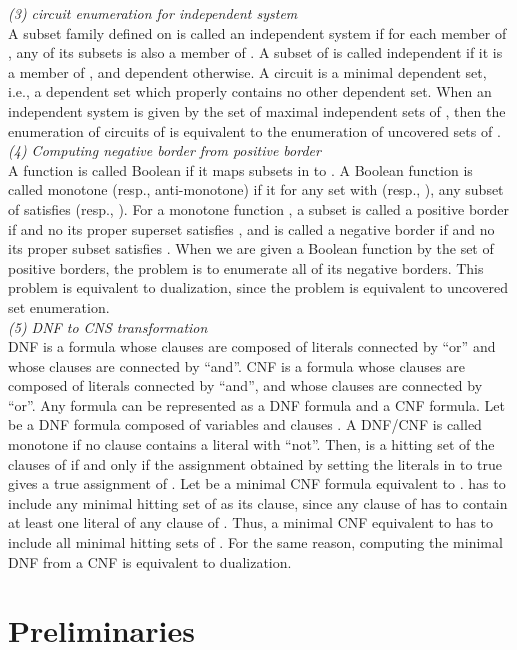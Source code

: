 {\em (3) circuit enumeration for independent system}\\
A subset family  defined on  is called an independent system
 if for each member  of , any of its subsets is also a member
 of .
A subset of  is called independent if it is a member of ,
 and dependent otherwise.
A circuit is a minimal dependent set, i.e., a dependent set which properly
 contains no other dependent set.
When an independent system is given by the set of maximal independent sets
 of , then the enumeration of circuits of  is equivalent
 to the enumeration of uncovered sets of .\\

{\em (4) Computing negative border from positive border}\\
A function is called Boolean if it maps subsets in  to .
A Boolean function  is called monotone (resp., anti-monotone)
 if it for any set  with  (resp., ), any subset  of
  satisfies  (resp., ).
For a monotone function , a subset  is called a positive border if
  and no its proper superset  satisfies  , and is called
 a negative border if  and no its proper subset  satisfies .
When we are given a Boolean function by the set of positive borders,
 the problem is to enumerate all of its negative borders.
This problem is equivalent to dualization, since the problem is equivalent
 to uncovered set enumeration.\\

{\em (5) DNF to CNS transformation}\\
DNF is a formula whose clauses are composed of literals connected by ``or''
 and whose clauses are connected by ``and''.
CNF is a formula whose clauses are composed of literals connected by ``and'',
 and whose clauses are connected by ``or''.
Any formula can be represented as a DNF formula and a CNF formula.
Let  be a DNF formula composed of variables  and clauses
 .
A DNF/CNF is called monotone if no clause contains a literal with ``not''.
Then,  is a hitting set of the clauses of  if and only if the
 assignment obtained by setting the literals in  to true gives a true
 assignment of .
Let  be a minimal CNF formula equivalent to .
 has to include any minimal hitting set of  as its clause, since
 any clause of  has to contain at least one literal of any clause of .
Thus, a minimal CNF equivalent to  has to include all minimal hitting
 sets of .
For the same reason, computing the minimal DNF from a CNF is equivalent
 to dualization.


\section{Preliminaries}

